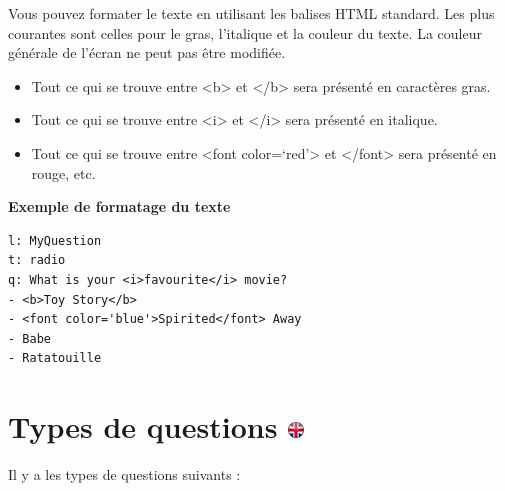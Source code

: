 \documentclass[
]{book}
\providecommand{\tightlist}{%
  \setlength{\itemsep}{0pt}\setlength{\parskip}{0pt}}
\begin{document}
Vous pouvez formater le texte en utilisant les balises HTML standard. Les plus courantes sont celles pour le gras, l'italique et la couleur du texte. La couleur générale de l'écran ne peut pas être modifiée.

\begin{itemize}
\tightlist
\item
  Tout ce qui se trouve entre \textless b\textgreater{} et \textless/b\textgreater{} sera présenté en caractères gras.
\item
  Tout ce qui se trouve entre \textless i\textgreater{} et \textless/i\textgreater{} sera présenté en italique.
\item
  Tout ce qui se trouve entre \textless font color=`red'\textgreater{} et \textless/font\textgreater{} sera présenté en rouge, etc.
\end{itemize}

\textbf{Exemple de formatage du texte}

\begin{verbatim}
l: MyQuestion
t: radio
q: What is your <i>favourite</i> movie?
- <b>Toy Story</b>
- <font color='blue'>Spirited</font> Away
- Babe
- Ratatouille
\end{verbatim}

\hypertarget{types-de-questions}{%
\section[Types de questions ]{\texorpdfstring{Types de questions \href{https://www.psytoolkit.org/doc3.4.0/online-survey-syntax.html\#questiontypes}{\protect\includegraphics{img/ukflag.png}}}{Types de questions }}\label{types-de-questions}}

Il y a les types de questions suivants :
\end{document}
